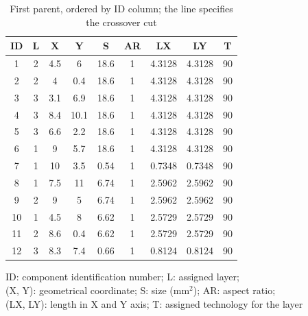 \begin{table}[h!]
\caption{First parent, ordered by ID column; the line specifies the crossover cut}
\begin{center}
\begin{scriptsize}
\begin{tabular}{|c|c|c|c|c|c|c|c|c|}
\hline ID & L & X & Y & S & AR & LX & LY & T\\
\hline 1 & 2 & 4.5 & 6 & 18.6 & 1 & 4.3128 & 4.3128 & 90\\
2 & 2 & 4 & 0.4 & 18.6 & 1 & 4.3128 & 4.3128 & 90\\
3 & 3 & 3.1 & 6.9 & 18.6 & 1 & 4.3128 & 4.3128 & 90\\
4 & 3 & 8.4 & 10.1 & 18.6 & 1 & 4.3128 & 4.3128 & 90\\
5 & 3 & 6.6 & 2.2 & 18.6 & 1 & 4.3128 & 4.3128 & 90\\
6 & 1 & 9 & 5.7 & 18.6 & 1 & 4.3128 & 4.3128 & 90\\
7 & 1 & 10 & 3.5 & 0.54 & 1 & 0.7348 & 0.7348 & 90\\
\hline
\hline
8 & 1 & 7.5 & 11 & 6.74 & 1 & 2.5962 & 2.5962 & 90\\
9 & 2 & 9 & 5 & 6.74 & 1 & 2.5962 & 2.5962 & 90\\
10 & 1 & 4.5 & 8 & 6.62 & 1 & 2.5729 & 2.5729 & 90\\
11 & 2 & 8.6 & 0.4 & 6.62 & 1 & 2.5729 & 2.5729 & 90\\
12 & 3 & 8.3 & 7.4 & 0.66 & 1 & 0.8124 & 0.8124 & 90\\
\hline
\end{tabular}
\end{scriptsize}
\end{center}
\begin{center}
\begin{scriptsize}
ID: component identification number; L: assigned layer;\\
(X, Y): geometrical coordinate; S: size (mm$^2$); AR: aspect ratio;\\
(LX, LY): length in X and Y axis; T: assigned technology for the layer
\end{scriptsize}
\end{center}
\label{tab:firstparentIDrow}
\end{table}

